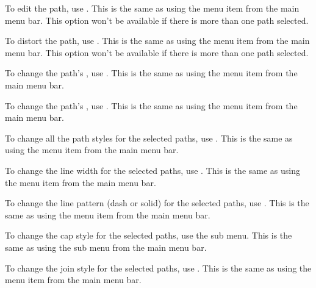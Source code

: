 
To edit the path, use . This is the same as using
the  menu item from the main menu bar.
This option won't be available if there is more than one
path selected.


To distort the path, use . This is the same as using
the  menu item from the main menu bar.
This option won't be available if there is more than one
path selected.


To change the path's , use
. This is the same as using the
 menu item from the main menu bar.


To change the path's , use
. This is the same as using the
 menu item from the main menu bar.


To change all the path styles for the selected paths,
use . This is the same as using the
 menu item from the main menu bar.


To change the line width for the selected paths,
use . This is the same as using the
 menu item from the main menu bar.


To change the line pattern (dash or solid) for the selected paths,
use . This is the same as using the
 menu item from the main menu bar.


To change the cap style for the selected paths,
use the  sub menu. This is the same as using the
 sub menu from the main menu bar.


To change the join style for the selected paths,
use . This is the same as using the
 menu item from the main menu bar.

